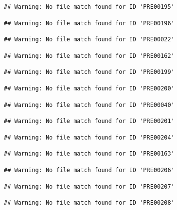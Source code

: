 \documentclass[
]{book}
\theoremstyle{definition}
\theoremstyle{definition}
\theoremstyle{definition}
\theoremstyle{definition}
\theoremstyle{remark}
\begin{document}
\begin{verbatim}
## Warning: No file match found for ID 'PRE00195'
\end{verbatim}

\begin{verbatim}
## Warning: No file match found for ID 'PRE00196'
\end{verbatim}

\begin{verbatim}
## Warning: No file match found for ID 'PRE00022'
\end{verbatim}

\begin{verbatim}
## Warning: No file match found for ID 'PRE00162'
\end{verbatim}

\begin{verbatim}
## Warning: No file match found for ID 'PRE00199'
\end{verbatim}

\begin{verbatim}
## Warning: No file match found for ID 'PRE00200'
\end{verbatim}

\begin{verbatim}
## Warning: No file match found for ID 'PRE00040'
\end{verbatim}

\begin{verbatim}
## Warning: No file match found for ID 'PRE00201'
\end{verbatim}

\begin{verbatim}
## Warning: No file match found for ID 'PRE00204'
\end{verbatim}

\begin{verbatim}
## Warning: No file match found for ID 'PRE00163'
\end{verbatim}

\begin{verbatim}
## Warning: No file match found for ID 'PRE00206'
\end{verbatim}

\begin{verbatim}
## Warning: No file match found for ID 'PRE00207'
\end{verbatim}

\begin{verbatim}
## Warning: No file match found for ID 'PRE00208'
\end{verbatim}
\end{document}
